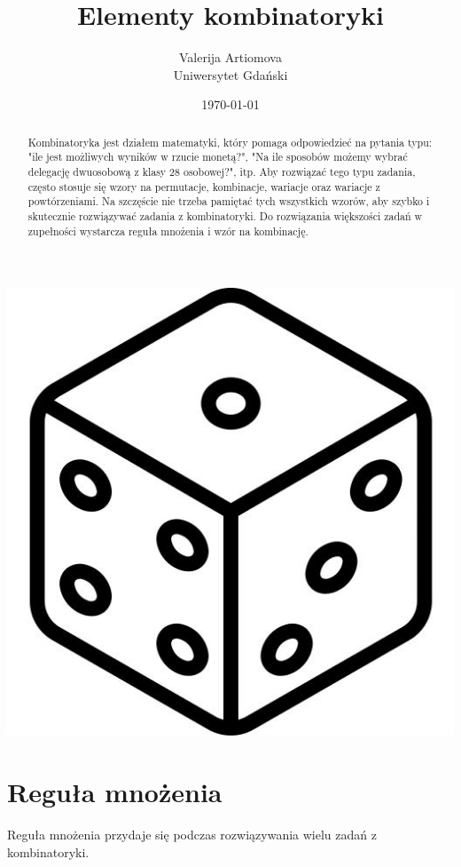 \documentclass[polish,10pt]{article}
\title{Elementy kombinatoryki}
\author{Valerija Artiomova \\
	Uniwersytet Gdański}
\date{\today}
\begin{document}
\begin{titlepage}
\maketitle

\begin{abstract}
Kombinatoryka jest działem matematyki, który pomaga odpowiedzieć na pytania typu: "ile jest możliwych wyników w rzucie monetą?", "Na ile sposobów możemy wybrać delegację dwuosobową z klasy 28 osobowej?", itp.
Aby rozwiązać tego typu zadania, często stosuje się wzory na permutacje, kombinacje, wariacje oraz wariacje z powtórzeniami.
Na szczęście nie trzeba pamiętać tych wszystkich wzorów, aby szybko i skutecznie rozwiązywać zadania z kombinatoryki.
Do rozwiązania większości zadań w zupełności wystarcza reguła mnożenia i wzór na kombinację.
\end{abstract}
\begin{center}
\includegraphics[scale=0.2, ]{images/cube.jpeg}
\end{center}
\end{titlepage}


\section{Reguła mnożenia}
Reguła mnożenia przydaje się podczas rozwiązywania wielu zadań z kombinatoryki.\cite{RM}
\end{document}
